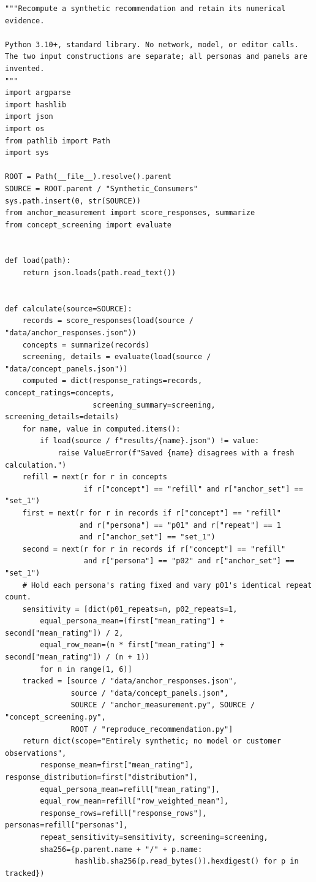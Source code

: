 \begin{Verbatim}[breaklines,breakanywhere,fontsize=\small]
"""Recompute a synthetic recommendation and retain its numerical evidence.

Python 3.10+, standard library. No network, model, or editor calls.
The two input constructions are separate; all personas and panels are invented.
"""
import argparse
import hashlib
import json
import os
from pathlib import Path
import sys

ROOT = Path(__file__).resolve().parent
SOURCE = ROOT.parent / "Synthetic_Consumers"
sys.path.insert(0, str(SOURCE))
from anchor_measurement import score_responses, summarize
from concept_screening import evaluate


def load(path):
    return json.loads(path.read_text())


def calculate(source=SOURCE):
    records = score_responses(load(source / "data/anchor_responses.json"))
    concepts = summarize(records)
    screening, details = evaluate(load(source / "data/concept_panels.json"))
    computed = dict(response_ratings=records, concept_ratings=concepts,
                    screening_summary=screening, screening_details=details)
    for name, value in computed.items():
        if load(source / f"results/{name}.json") != value:
            raise ValueError(f"Saved {name} disagrees with a fresh calculation.")
    refill = next(r for r in concepts
                  if r["concept"] == "refill" and r["anchor_set"] == "set_1")
    first = next(r for r in records if r["concept"] == "refill"
                 and r["persona"] == "p01" and r["repeat"] == 1
                 and r["anchor_set"] == "set_1")
    second = next(r for r in records if r["concept"] == "refill"
                  and r["persona"] == "p02" and r["anchor_set"] == "set_1")
    # Hold each persona's rating fixed and vary p01's identical repeat count.
    sensitivity = [dict(p01_repeats=n, p02_repeats=1,
        equal_persona_mean=(first["mean_rating"] + second["mean_rating"]) / 2,
        equal_row_mean=(n * first["mean_rating"] + second["mean_rating"]) / (n + 1))
        for n in range(1, 6)]
    tracked = [source / "data/anchor_responses.json",
               source / "data/concept_panels.json",
               SOURCE / "anchor_measurement.py", SOURCE / "concept_screening.py",
               ROOT / "reproduce_recommendation.py"]
    return dict(scope="Entirely synthetic; no model or customer observations",
        response_mean=first["mean_rating"], response_distribution=first["distribution"],
        equal_persona_mean=refill["mean_rating"],
        equal_row_mean=refill["row_weighted_mean"],
        response_rows=refill["response_rows"], personas=refill["personas"],
        repeat_sensitivity=sensitivity, screening=screening,
        sha256={p.parent.name + "/" + p.name:
                hashlib.sha256(p.read_bytes()).hexdigest() for p in tracked})



\end{Verbatim}
